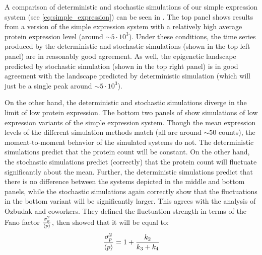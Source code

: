 A comparison of deterministic and stochastic simulations of our simple expression system (see \eqref{eq:simple_expression}) can be seen in . The top panel shows results from a version of the simple expression system with a relatively high average protein expression level (around ${\sim}5 \cdot 10^{3}$). Under these conditions, the time series produced by the deterministic and stochastic simulations (shown in the top left panel) are in reasonably good agreement. As well, the epigenetic landscape predicted by stochastic simulation (shown in the top right panel) is in good agreement with the landscape predicted by deterministic simulation (which will just be a single peak around ${\sim}5 \cdot 10^{3}$). 

On the other hand, the deterministic and stochastic simulations diverge in the limit of low protein expression. The bottom two panels of  show simulations of low expression variants of the simple expression system. Though the mean expression levels of the different simulation methods match (all are around ${\sim}50$ counts), the moment-to-moment behavior of the simulated systems do not. The deterministic simulations predict that the protein count will be constant. On the other hand, the stochastic simulations predict (correctly) that the protein count will fluctuate significantly about the mean. Further, the deterministic simulations predict that there is no difference between the systems depicted in the middle and bottom panels, while the stochastic simulations again correctly show that the fluctuations in the bottom variant will be significantly larger. This agrees with the analysis of Ozbudak and coworkers\supercite{Ozbudak:2002iq}. They defined the fluctuation strength in terms of the Fano factor $\frac{\sigma^{2}_{p}}{\left\langle p \right\rangle}$, then showed that it will be equal to:
\begin{equation}\label{eq:simple_expression_noise_strength}
    \frac{\sigma^{2}_{p}}{\left\langle p \right\rangle} = 1 + \frac{k_{2}}{k_{3} + k_{4}}
\end{equation}

